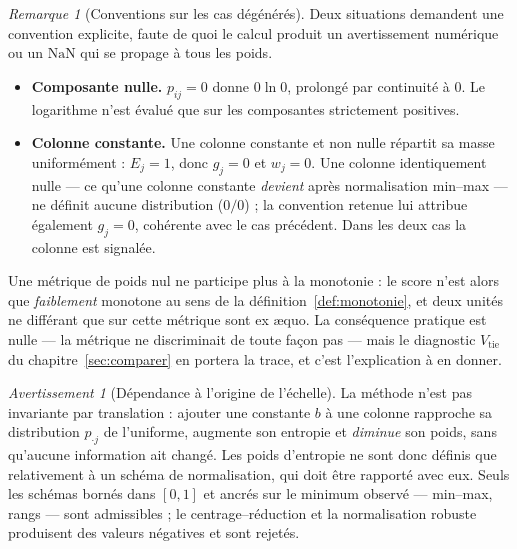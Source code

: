 \documentclass[11pt,a4paper]{article}
\theoremstyle{definition}
\theoremstyle{remark}
\newtheorem{remarque}{Remarque}[section]
\newtheorem{avertissement}{Avertissement}[section]
\begin{document}
\begin{remarque}[Conventions sur les cas dégénérés]
  \label{rem:entropie-degenere}
  Deux situations demandent une convention explicite, faute de quoi le calcul produit un
  avertissement numérique ou un $\mathrm{NaN}$ qui se propage à tous les poids.

  \medskip

  \begin{itemize}[nosep,leftmargin=1.4em]
    \item \textbf{Composante nulle.} $p_{ij} = 0$ donne $0 \ln 0$, prolongé par
    continuité à $0$. Le logarithme n'est évalué que sur les composantes strictement
    positives.
    \item \textbf{Colonne constante.} Une colonne constante et non nulle répartit sa
    masse uniformément : $E_j = 1$, donc $g_j = 0$ et $w_j = 0$. Une colonne
    identiquement nulle --- ce qu'une colonne constante \emph{devient} après
    normalisation min--max --- ne définit aucune distribution ($0/0$) ; la convention
    retenue lui attribue également $g_j = 0$, cohérente avec le cas précédent. Dans les
    deux cas la colonne est signalée.
  \end{itemize}

  \bigskip

  Une métrique de poids nul ne participe plus à la monotonie : le score n'est alors que
  \emph{faiblement} monotone au sens de la définition~\ref{def:monotonie}, et deux unités
  ne différant que sur cette métrique sont ex \ae quo. La conséquence pratique est nulle
  --- la métrique ne discriminait de toute façon pas --- mais le diagnostic
  $V_{\mathrm{tie}}$ du chapitre~\ref{sec:comparer} en portera la trace, et c'est
  l'explication à en donner.
\end{remarque}

\bigskip

\begin{avertissement}[Dépendance à l'origine de l'échelle]
  \label{av:entropie-translation}
  La méthode n'est pas invariante par translation : ajouter une constante $b$ à une
  colonne rapproche sa distribution $p_{\cdot j}$ de l'uniforme, augmente son entropie et
  \emph{diminue} son poids, sans qu'aucune information ait changé. Les poids d'entropie
  ne sont donc définis que relativement à un schéma de normalisation, qui doit être
  rapporté avec eux. Seuls les schémas bornés dans $[0,1]$ et ancrés sur le minimum
  observé --- min--max, rangs --- sont admissibles ; le centrage--réduction et la
  normalisation robuste produisent des valeurs négatives et sont rejetés.
\end{avertissement}
\end{document}
